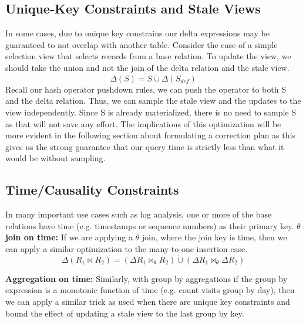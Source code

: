 \subsection{Unique-Key Constraints and Stale Views}
In some cases, due to unique key constrains our delta expressions may be guaranteed to not overlap with another table. Consider the case of a simple selection view that selects records from a base relation. To update the view, we should take the union and not the join of the delta relation and the stale view. 
\[ \Delta(S) = S \dot{\cup} \Delta(S_{def}) \]
Recall our hash operator pushdown rules, we can push the operator to both S and the delta relation.
Thus, we can sample the stale view and the updates to the view independently.
Since S is already materialized, there is no need to sample S as that will not save any effort.
The implications of this optimization will be more evident in the following section about formulating a correction plan as this gives us the strong guarantee that our query time is strictly less than what it would be without sampling.

\subsection{Time/Causality Constraints}
In many important use cases such as log analysis, one or more of the base relations have time (e.g. timestamps or sequence numbers) as their primary key.
\textbf{$\theta$ join on time: } If we are applying a $\theta$ join, where the join key is time, then we can apply a similar optimization to the many-to-one insertion case.
\[ \Delta(R_1 \bowtie R_2) =   (\Delta R_1 \bowtie_{\theta}  R_2) \dot{\cup} (\Delta R_1 \bowtie_{\theta}  \Delta R_2)\]

\textbf{Aggregation on time: } Similarly, with group by aggregations if the group by expression is a monotonic function of time (e.g. count visits group by day), then we can apply a similar trick as used when there are unique key constraints and bound the effect of updating a stale view to the last group by key.



